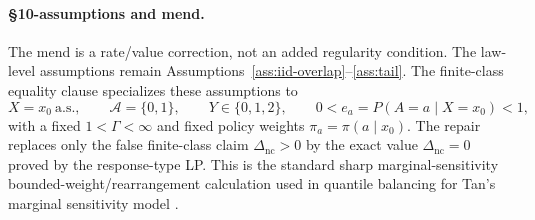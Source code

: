 \paragraph{\S10-assumptions and mend.}
The mend is a rate/value correction, not an added regularity condition.  The law-level assumptions
remain Assumptions~\ref{ass:iid-overlap}--\ref{ass:tail}.  The finite-class equality clause
specializes these assumptions to
\[
X=x_0\ \text{a.s.},\qquad
\mathcal A=\{0,1\},\qquad
Y\in\{0,1,2\},\qquad
0<e_a=P(A=a\mid X=x_0)<1,
\]
with a fixed \(1<\Gamma<\infty\) and fixed policy weights
\(\pi_a=\pi(a\mid x_0)\).  The repair replaces only the false finite-class claim
\(\Delta_{\mathrm{nc}}>0\) by the exact value \(\Delta_{\mathrm{nc}}=0\) proved by the response-type
LP.  This is the standard sharp marginal-sensitivity bounded-weight/rearrangement calculation used
in quantile balancing for Tan's marginal sensitivity model
\cite{DornGuo2021QuantileBalancing}.

